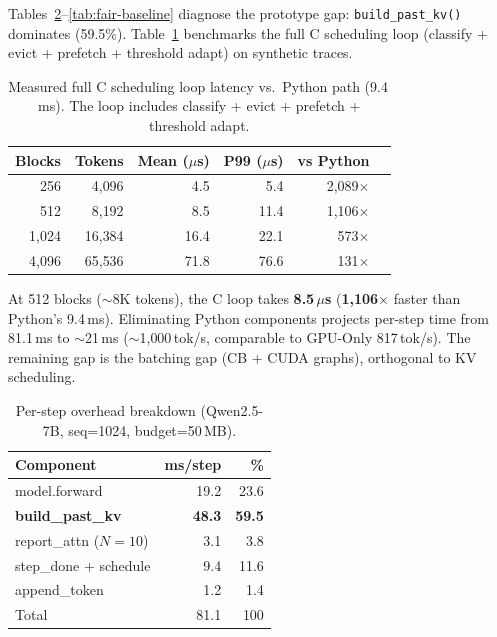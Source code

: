 \documentclass[conference]{IEEEtran}
\begin{document}
Tables~\ref{tab:overhead-breakdown}--\ref{tab:fair-baseline} diagnose the prototype gap: \texttt{build\_past\_kv()} dominates (59.5\%). Table~\ref{tab:native-loop} benchmarks the full C scheduling loop (classify + evict + prefetch + threshold adapt) on synthetic traces.

\begin{table}[t]
\centering
\caption{Measured full C scheduling loop latency vs.\ Python path (9.4\,ms). The loop includes classify + evict + prefetch + threshold adapt.}
\label{tab:native-loop}
\small
\setlength{\tabcolsep}{5pt}
\begin{tabular}{@{}rrrrrr@{}}
\toprule
Blocks & Tokens & Mean ($\mu$s) & P99 ($\mu$s) & vs Python \\
\midrule
256  & 4{,}096  & 4.5  & 5.4  & 2{,}089$\times$ \\
512  & 8{,}192  & 8.5  & 11.4 & 1{,}106$\times$ \\
1{,}024 & 16{,}384 & 16.4 & 22.1 & 573$\times$ \\
4{,}096 & 65{,}536 & 71.8 & 76.6 & 131$\times$ \\
\bottomrule
\end{tabular}
\end{table}

At 512 blocks (${\sim}$8K tokens), the C loop takes \textbf{8.5\,$\mu$s} (\textbf{1{,}106$\times$} faster than Python's 9.4\,ms). Eliminating Python components projects per-step time from 81.1\,ms to ${\sim}$21\,ms (${\sim}$1{,}000\,tok/s, comparable to GPU-Only 817\,tok/s). The remaining gap is the batching gap (CB + CUDA graphs), orthogonal to KV scheduling.

\begin{table}[t]
\centering
\caption{Per-step overhead breakdown (Qwen2.5-7B, seq=1024, budget=50\,MB).}
\label{tab:overhead-breakdown}
\small
\setlength{\tabcolsep}{10pt}
\begin{tabular}{@{}lrr@{}}
\toprule
Component & ms/step & \% \\
\midrule
model.forward & 19.2 & 23.6 \\
\textbf{build\_past\_kv} & \textbf{48.3} & \textbf{59.5} \\
report\_attn ($N{=}10$) & 3.1 & 3.8 \\
step\_done + schedule & 9.4 & 11.6 \\
append\_token & 1.2 & 1.4 \\
\midrule
Total & 81.1 & 100 \\
\bottomrule
\end{tabular}
\end{table}
\end{document}

